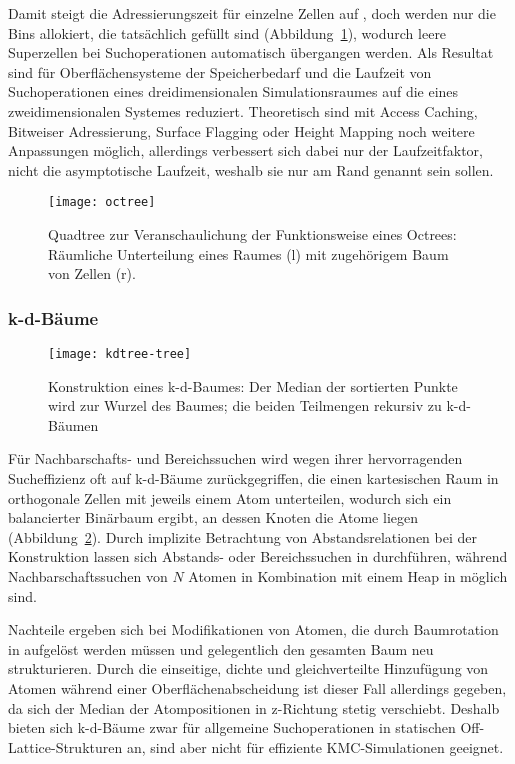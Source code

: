 Damit steigt die Adressierungszeit für einzelne Zellen auf , doch werden nur die Bins allokiert, die tatsächlich gefüllt sind (Abbildung~\ref{fig:octree}), wodurch leere Superzellen bei Suchoperationen automatisch übergangen werden.
Als Resultat sind für Oberflächensysteme der Speicherbedarf und die Laufzeit von Suchoperationen eines dreidimensionalen Simulationsraumes auf die eines zweidimensionalen Systemes reduziert.
Theoretisch sind mit Access Caching, Bitweiser Adressierung, Surface Flagging oder Height Mapping noch weitere Anpassungen möglich, allerdings verbessert sich dabei nur der Laufzeitfaktor, nicht die asymptotische Laufzeit, weshalb sie nur am Rand genannt sein sollen.

\begin{figure}[t]
  \centering
  \texttt{[image: octree]}
  \caption[Schema der Funktionsweise eines Octrees]{
    Quadtree zur Veranschaulichung der Funktionsweise eines Octrees:
    Räumliche Unterteilung eines Raumes (l) mit zugehörigem Baum von Zellen (r).
  }
  \label{fig:octree}
\end{figure}

\subsubsection{k-d-Bäume}
\label{datakdtree}

\begin{figure}[b]
  \texttt{[image: kdtree-tree]}
  \caption[Konstruktion eines k-d-Baumes]{
    Konstruktion eines k-d-Baumes:
    Der Median der sortierten Punkte wird zur Wurzel des Baumes; die beiden Teilmengen rekursiv zu k-d-Bäumen
  }
  \label{fig:kdtree}
\end{figure}

Für Nachbarschafts- und Bereichssuchen wird wegen ihrer hervorragenden Sucheffizienz oft auf k-d-Bäume zurückgegriffen, die einen kartesischen Raum in orthogonale Zellen mit jeweils einem Atom unterteilen, wodurch sich ein balancierter Binärbaum ergibt, an dessen Knoten die Atome liegen (Abbildung~\ref{fig:kdtree}).
Durch implizite Betrachtung von Abstandsrelationen bei der Konstruktion lassen sich Abstands- oder Bereichssuchen in  durchführen, während Nachbarschaftssuchen von $N$ Atomen in Kombination mit einem Heap in  möglich sind.

Nachteile ergeben sich bei Modifikationen von Atomen, die durch Baumrotation in  aufgelöst werden müssen und gelegentlich den gesamten Baum neu strukturieren.
Durch die einseitige, dichte und gleichverteilte Hinzufügung von Atomen während einer Oberflächenabscheidung ist dieser Fall allerdings gegeben, da sich der Median der Atompositionen in z-Richtung stetig verschiebt.
Deshalb bieten sich k-d-Bäume zwar für allgemeine Suchoperationen in statischen Off-Lattice-Strukturen an, sind aber nicht für effiziente KMC-Simulationen geeignet.

